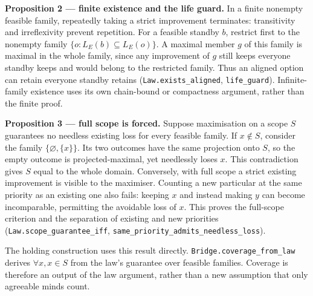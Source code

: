 \documentclass[
]{article}
\newcounter{none} %
\begin{document}
\textbf{Proposition 2 --- finite existence and the life guard.} In a
finite nonempty feasible family, repeatedly taking a strict improvement
terminates: transitivity and irreflexivity prevent repetition. For a
feasible standby \(b\), restrict first to the nonempty family
\(\{o:L_E(b)\subseteq L_E(o)\}\). A maximal member \(g\) of this family
is maximal in the whole family, since any improvement of \(g\) still
keeps everyone standby keeps and would belong to the restricted family.
Thus an aligned option can retain everyone standby retains
(\texttt{L\allowbreak{}a\allowbreak{}w\allowbreak{}.\allowbreak{}e\allowbreak{}x\allowbreak{}i\allowbreak{}s\allowbreak{}t\allowbreak{}s\allowbreak{}\_\allowbreak{}a\allowbreak{}l\allowbreak{}i\allowbreak{}g\allowbreak{}n\allowbreak{}e\allowbreak{}d},
\texttt{life\_guard}). Infinite-family existence uses its own
chain-bound or compactness argument, rather than the finite proof.

\textbf{Proposition 3 --- full scope is forced.} Suppose maximisation on
a scope \(S\) guarantees no needless existing loss for every feasible
family. If \(x\notin S\), consider the family \(\{\varnothing,\{x\}\}\).
Its two outcomes have the same projection onto \(S\), so the empty
outcome is projected-maximal, yet needlessly loses \(x\). This
contradiction gives \(S\) equal to the whole domain. Conversely, with
full scope a strict existing improvement is visible to the maximiser.
Counting a new particular at the same priority as an existing one also
fails: keeping \(x\) and instead making \(y\) can become incomparable,
permitting the avoidable loss of \(x\). This proves the full-scope
criterion and the separation of existing and new priorities
(\texttt{L\allowbreak{}a\allowbreak{}w\allowbreak{}.\allowbreak{}s\allowbreak{}c\allowbreak{}o\allowbreak{}p\allowbreak{}e\allowbreak{}\_\allowbreak{}g\allowbreak{}u\allowbreak{}a\allowbreak{}r\allowbreak{}a\allowbreak{}n\allowbreak{}t\allowbreak{}e\allowbreak{}e\allowbreak{}\_\allowbreak{}i\allowbreak{}f\allowbreak{}f},
\texttt{s\allowbreak{}a\allowbreak{}m\allowbreak{}e\allowbreak{}\_\allowbreak{}p\allowbreak{}r\allowbreak{}i\allowbreak{}o\allowbreak{}r\allowbreak{}i\allowbreak{}t\allowbreak{}y\allowbreak{}\_\allowbreak{}a\allowbreak{}d\allowbreak{}m\allowbreak{}i\allowbreak{}t\allowbreak{}s\allowbreak{}\_\allowbreak{}n\allowbreak{}e\allowbreak{}e\allowbreak{}d\allowbreak{}l\allowbreak{}e\allowbreak{}s\allowbreak{}s\allowbreak{}\_\allowbreak{}l\allowbreak{}o\allowbreak{}s\allowbreak{}s}).

The holding construction uses this result directly.
\texttt{B\allowbreak{}r\allowbreak{}i\allowbreak{}d\allowbreak{}g\allowbreak{}e\allowbreak{}.\allowbreak{}c\allowbreak{}o\allowbreak{}v\allowbreak{}e\allowbreak{}r\allowbreak{}a\allowbreak{}g\allowbreak{}e\allowbreak{}\_\allowbreak{}f\allowbreak{}r\allowbreak{}o\allowbreak{}m\allowbreak{}\_\allowbreak{}l\allowbreak{}a\allowbreak{}w}
derives \(\forall x, x\in S\) from the law's guarantee over feasible
families. Coverage is therefore an output of the law argument, rather
than a new assumption that only agreeable minds count.
\end{document}
